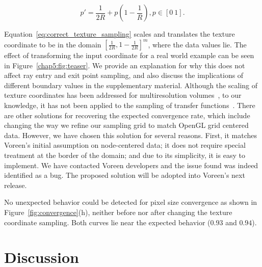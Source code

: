 \begin{equation}
	p' = \frac{1}{2R} + p\left(1-\frac{1}{R}\right), p \in [0 \  1].
	\label{eq:correct_texture_sampling}
\end{equation}

Equation~\eqref{eq:correct_texture_sampling} scales and translates the
texture coordinate to be in the domain $[\frac{1}{2R},
  1-\frac{1}{2R}]^m$, where the data values lie.  The effect of
transforming the input coordinate for a real world example can be seen
in Figure~\ref{chap5:fig:teaser}.  We provide an explanation for why this
does not affect ray entry and exit point sampling, and also discuss
the implications of different boundary values in the supplementary
material.  Although the scaling of texture coordinates has been
addressed for multiresolution volumes~\cite{LjungLY06}, to our
knowledge, it has not been applied to the sampling of transfer
functions~\cite{Real-TimeVolumeGraphics06,Kruger03,Roettger03}.
%
There are other solutions for recovering the expected convergence
rate, which include changing the way we refine our sampling grid to
match OpenGL grid centered data.  However, we have chosen this
solution for several reasons. First, it matches Voreen's initial
assumption on node-centered data; it does not require special
treatment at the border of the domain; and due to its simplicity, it
is easy to implement.
%
We have contacted Voreen developers and the issue found was indeed
identified as a bug. The proposed solution will be adopted into
Voreen's next release.

No unexpected behavior could be detected for pixel size convergence as
shown in Figure~\ref{fig:convergence}(h), neither before nor
after changing the texture coordinate sampling. Both curves lie near 
the expected behavior ($0.93$ and $0.94$).




\section{Discussion}
\label{chap5:sec:discussion}

